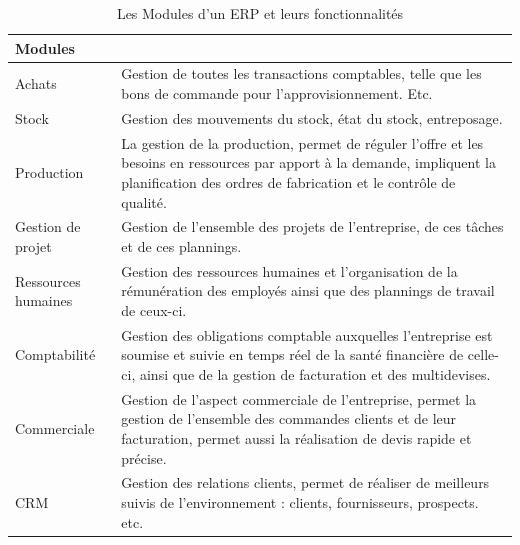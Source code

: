 \begin{table}[H]
    \begin{center}
        
        \begin{tabular}{|F{4cm}|R{10cm}|}
            \hline
            \textbf{Modules}  &  \\
            \hline
            Achats
            &
            Gestion de toutes les transactions comptables, telle que les bons de commande pour l’approvisionnement. Etc.\\
            
            \hline
            Stock
            &
            Gestion des mouvements du stock, état du stock, entreposage.\\
            
            \hline
            Production
            &
            La gestion de la production, permet de réguler l’offre et les besoins en
            ressources par apport à la demande, impliquent la planification des ordres
            de fabrication et le contrôle de qualité.\\
            
            \hline
            Gestion de projet
            &
            Gestion de l’ensemble des projets de l’entreprise, de ces tâches et de ces plannings.\\
            
            \hline
            Ressources humaines
            &
            Gestion des ressources humaines et l’organisation de la rémunération des employés ainsi que des plannings de travail de ceux-ci.\\
            
            
            \hline
            Comptabilité
            &
            Gestion des obligations comptable auxquelles l’entreprise est soumise et suivie en temps réel de la santé financière de celle-ci, ainsi que de la gestion de facturation et des multidevises.\\
            
            \hline
            Commerciale
            &
            Gestion de l’aspect commerciale de l’entreprise, permet la gestion de l’ensemble des commandes clients et de leur facturation, permet aussi la réalisation de devis rapide et précise.\\
            
            \hline
            CRM
            &
            Gestion des relations clients, permet de réaliser de meilleurs suivis de
            l’environnement : clients, fournisseurs, prospects. etc.\\
            
            
            \hline
        \end{tabular}	
        \caption{Les Modules d'un \acs{ERP} et leurs fonctionnalités}
    \end{center}
\end{table}

